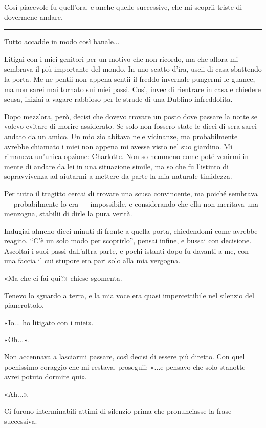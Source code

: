\documentclass[a4paper,11pt,oneside,openright,final]{memoir}
\begin{document}
Così piacevole fu quell'ora, e anche quelle successive, che mi scoprii triste di
dovermene andare.

\plainbreak{1}

Tutto accadde in modo così banale...

Litigai con i miei genitori per un motivo che non ricordo, ma che allora mi
sembrava il più importante del mondo. In uno scatto d'ira, uscii di casa
sbattendo la porta. Me ne pentii non appena sentii il freddo invernale pungermi
le guance, ma non sarei mai tornato sui miei passi. Così, invec di rientrare in
casa e chiedere scusa, iniziai a vagare rabbioso per le strade di una Dublino
infreddolita.

Dopo mezz'ora, però, decisi che dovevo trovare un posto dove passare la notte
se volevo evitare di morire assiderato. Se solo non fossero state le dieci di
sera sarei andato da un amico. Un mio zio abitava nele vicinanze, ma
probabilmente avrebbe chiamato i miei non appena mi avesse visto nel suo
giardino. Mi rimaneva un'unica opzione: Charlotte. Non so nemmeno come poté
venirmi in mente di andare da lei in una situazione simile, ma so che fu
l'istinto di sopravvivenza ad aiutarmi a mettere da parte la mia naturale
timidezza.

Per tutto il tragitto cercai di trovare una scusa convincente, ma poiché
sembrava --- probabilmente lo era --- impossibile, e considerando che ella non
meritava una menzogna, stabilii di dirle la pura verità.

Indugiai almeno dieci minuti di fronte a quella porta, chiedendomi come avrebbe
reagito. ``C'è un solo modo per scoprirlo'', pensai infine, e bussai con
decisione. Ascoltai i suoi passi dall'altra parte, e pochi istanti dopo fu
davanti a me, con una faccia il cui stupore era pari solo alla mia vergogna.

«Ma che ci fai qui?» chiese sgomenta.

Tenevo lo sguardo a terra, e la mia voce era quasi impercettibile nel silenzio
del pianerottolo.

«Io... ho litigato con i miei».

«Oh...».

Non accennava a lasciarmi passare, così decisi di essere più diretto. Con quel
pochissimo coraggio che mi restava, proseguii: «...e pensavo che solo stanotte
avrei potuto dormire qui».

«Ah...».

Ci furono interminabili attimi di silenzio prima che pronunciasse la frase
successiva.
\end{document}
